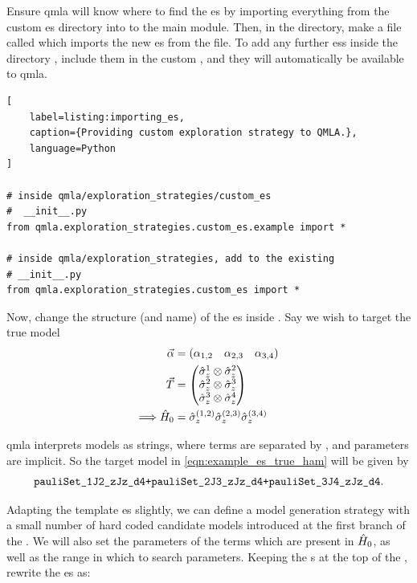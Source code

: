 Ensure \gls{qmla} will know where to find the \gls{es} by importing everything from the custom \gls{es} 
    directory into to the main  module. 
Then, in the  directory, make a file called  which imports the new \gls{es}
    from the  file. 
To add any further \glspl{es} inside the directory , include them in the custom ,
    and they will automatically be available to \gls{qmla}.

\begin{lstlisting}[
    label=listing:importing_es,
    caption={Providing custom exploration strategy to QMLA.},
    language=Python
]

# inside qmla/exploration_strategies/custom_es
#  __init__.py    
from qmla.exploration_strategies.custom_es.example import *

# inside qmla/exploration_strategies, add to the existing
# __init__.py 
from qmla.exploration_strategies.custom_es import *

\end{lstlisting}

Now, change the structure (and name) of the \gls{es} inside . 
Say we wish to target the \gls{true model} 
\begin{equation}
    \label{eqn:example_es_true_ham}
    \begin{split}
        \vec{\alpha} &= \begin{matrix}( \alpha_{1,2} & \alpha_{2,3} & \alpha_{3,4})\end{matrix} \\
        { \vec{T} } &= \left(\begin{matrix} \hat{\sigma}_{z}^1 \otimes \hat{\sigma}_{z}^2 \\ \hat{\sigma}_{z}^2 \otimes \hat{\sigma}_{z}^3  \\ \hat{\sigma}_{z}^3 \otimes \hat{\sigma}_{z}^4 \end{matrix}\right) \\
        \Longrightarrow \hat{H}_0 &= \hat{\sigma}_{z}^{(1,2)} \hat{\sigma}_{z}^{(2,3)} \hat{\sigma}_{z}^{(3,4)} \\
    \end{split}
\end{equation}

\gls{qmla} interprets models as strings, where terms are separated by \ttt{+}, and parameters are implicit. 
So the target model in \cref{eqn:example_es_true_ham} will be given by 
$$ \texttt{pauliSet\_1J2\_zJz\_d4+pauliSet\_2J3\_zJz\_d4+pauliSet\_3J4\_zJz\_d4}. $$

Adapting the template \gls{es} slightly, we can define a model generation strategy with a small number of hard coded 
    candidate models introduced at the first branch of the . 
We will also set the parameters of the terms which are present in $\hat{H}_0$, as well as the range in which to search parameters.
Keeping the s at the top of the , rewrite the \gls{es} as: 

